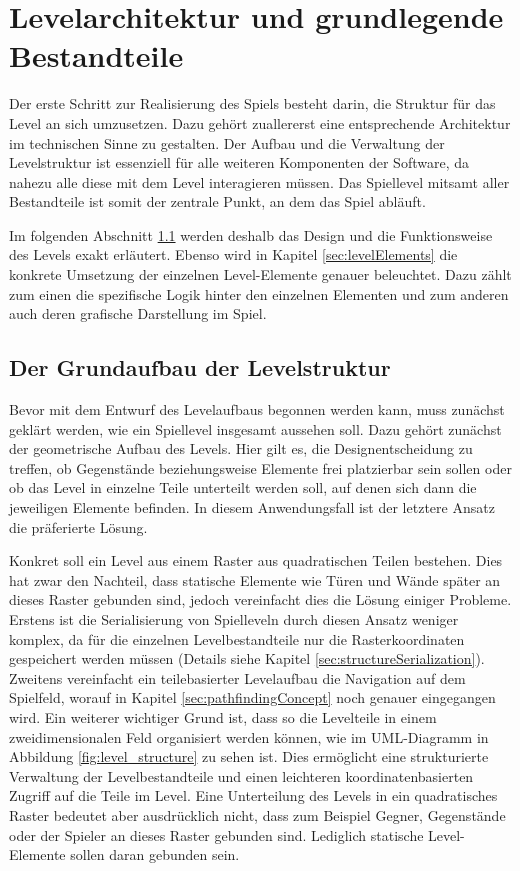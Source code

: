 \section{Levelarchitektur und grundlegende Bestandteile}\label{sec:levelArchitecture}
Der erste Schritt zur Realisierung des Spiels besteht darin, die Struktur für das Level an sich umzusetzen. Dazu gehört zuallererst eine entsprechende Architektur im technischen Sinne zu gestalten. Der Aufbau und die Verwaltung der Levelstruktur ist essenziell für alle weiteren Komponenten der Software, da nahezu alle diese mit dem Level interagieren müssen. Das Spiellevel mitsamt aller Bestandteile ist somit der zentrale Punkt, an dem das Spiel abläuft.

Im folgenden Abschnitt \ref{sec:levelStructure} werden deshalb das Design und die Funktionsweise des Levels exakt erläutert. Ebenso wird in Kapitel \ref{sec:levelElements} die konkrete Umsetzung der einzelnen Level-Elemente genauer beleuchtet. Dazu zählt zum einen die spezifische Logik hinter den einzelnen Elementen und zum anderen auch deren grafische Darstellung im Spiel.

\subsection{Der Grundaufbau der Levelstruktur}\label{sec:levelStructure}
Bevor mit dem Entwurf des Levelaufbaus begonnen werden kann, muss zunächst geklärt werden, wie ein Spiellevel insgesamt aussehen soll. Dazu gehört zunächst der geometrische Aufbau des Levels. Hier gilt es, die Designentscheidung zu treffen, ob Gegenstände beziehungsweise Elemente frei platzierbar sein sollen oder ob das Level in einzelne Teile unterteilt werden soll, auf denen sich dann die jeweiligen Elemente befinden. In diesem Anwendungsfall ist der letztere Ansatz die präferierte Lösung.

Konkret soll ein Level aus einem Raster aus quadratischen Teilen bestehen. Dies hat zwar den Nachteil, dass statische Elemente wie Türen und Wände später an dieses Raster gebunden sind, jedoch vereinfacht dies die Lösung einiger Probleme. Erstens ist die Serialisierung von Spielleveln durch diesen Ansatz weniger komplex, da für die einzelnen Levelbestandteile nur die Rasterkoordinaten gespeichert werden müssen (Details siehe Kapitel \ref{sec:structureSerialization}). Zweitens vereinfacht ein teilebasierter Levelaufbau die Navigation auf dem Spielfeld, worauf in Kapitel \ref{sec:pathfindingConcept} noch genauer eingegangen wird. Ein weiterer wichtiger Grund ist, dass so die Levelteile in einem zweidimensionalen Feld organisiert werden können, wie im UML-Diagramm in Abbildung \ref{fig:level_structure} zu sehen ist. Dies ermöglicht eine strukturierte Verwaltung der Levelbestandteile und einen leichteren koordinatenbasierten Zugriff auf die Teile im Level. Eine Unterteilung des Levels in ein quadratisches Raster bedeutet aber ausdrücklich nicht, dass zum Beispiel Gegner, Gegenstände oder der Spieler an dieses Raster gebunden sind. Lediglich statische Level-Elemente sollen daran gebunden sein.

